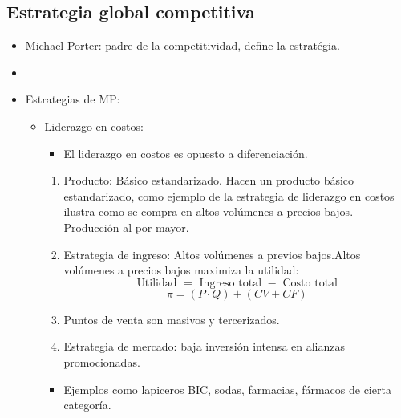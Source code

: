 \subsection{Estrategia global competitiva}
\begin{itemize}
    \item Michael Porter: padre de la competitividad, define la estratégia.
    \item {} 
    \item Estrategias de MP:
        \begin{itemize}
            \item Liderazgo en costos: 
                \begin{itemize}
                    \item El liderazgo en costos es opuesto a diferenciación. 
                \end{itemize}
                \begin{enumerate}
                    \item Producto: Básico estandarizado. Hacen un producto básico estandarizado, como ejemplo de la estrategia de liderazgo en costos ilustra como se compra en altos volúmenes a precios bajos. Producción al por mayor.
                    \item Estrategia de ingreso: Altos volúmenes a previos bajos.Altos volúmenes a precios bajos maximiza la utilidad:
                        \[
                        \text{ Utilidad }= \text{ Ingreso total } - \text{ Costo total }
                        \]
                        \[
                        \pi = (P\cdot Q) + (CV+CF)
                        \]
                    
                    \item Puntos de venta son masivos y tercerizados.
                    \item Estrategia de mercado: baja inversión intensa en alianzas promocionadas.
                \end{enumerate}
                \begin{itemize}[label=\#]
                    \item Ejemplos como lapiceros BIC, sodas, farmacias, fármacos de cierta categoría.
                \end{itemize}


\end{itemize}
\end{itemize}
